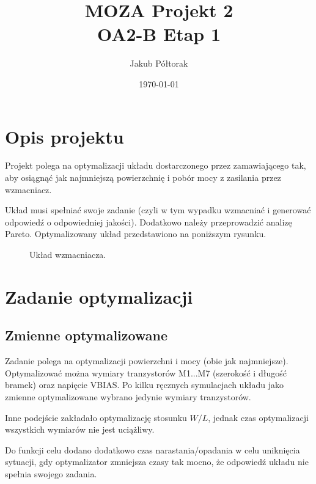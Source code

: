 \documentclass{article}
\title{\huge  \Huge \textbf{MOZA Projekt 2} \\ \textbf{OA2-B}}
\date{\today}
\author{ \LARGE Jakub Półtorak}
\begin{document}
\maketitle
{}
\newpage
{}


\begin{center}
\title{ \huge \textbf{Etap 1}}
\end{center}
\tableofcontents

\section{Opis projektu}
Projekt polega na optymalizacji układu dostarczonego przez zamawiającego tak, aby osiągnąć jak najmniejszą powierzchnię i pobór mocy z zasilania przez wzmacniacz. 

Układ musi spełniać swoje zadanie (czyli w tym wypadku wzmacniać i generować odpowiedź o odpowiedniej jakości).
Dodatkowo należy przeprowadzić analizę Pareto. Optymalizowany układ przedstawiono na poniższym rysunku.



\begin{figure}[h]
\centering

\caption{Układ wzmacniacza.}
\end{figure}





\section{Zadanie optymalizacji}
\subsection{Zmienne optymalizowane}


Zadanie polega na optymalizacji powierzchni i mocy (obie jak najmniejsze). Optymalizować można wymiary tranzystorów M1...M7 (szerokość i długość bramek) oraz napięcie VBIAS.
Po kilku ręcznych symulacjach układu jako zmienne optymalizowane wybrano jedynie wymiary tranzystorów. 

Inne podejście zakładało optymalizację stosunku \(W/L\), jednak czas optymalizacji wszystkich wymiarów nie jest uciążliwy.

Do funkcji celu dodano dodatkowo czas narastania/opadania w celu uniknięcia sytuacji, gdy optymalizator zmniejsza czasy tak mocno, że odpowiedź układu nie spełnia swojego zadania.
\end{document}
